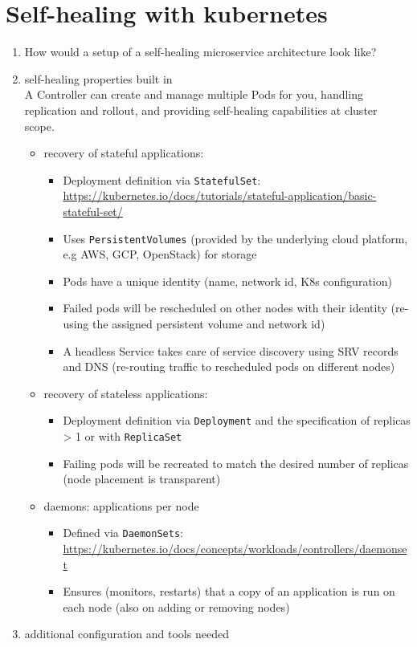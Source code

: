 \section{Self-healing with \gls{kubernetes}}
  \begin{enumerate}
    \item How would a setup of a self-healing microservice architecture look like?
    \item self-healing properties built in\hfill\\
          A Controller can create and manage multiple Pods for you, handling replication and rollout, and providing self-healing capabilities at cluster scope.

          \begin{itemize}
            \item recovery of stateful applications:
              \begin{itemize}
                \item Deployment definition via \texttt{StatefulSet}: \url{https://kubernetes.io/docs/tutorials/stateful-application/basic-stateful-set/}
                \item  Uses \texttt{PersistentVolumes} (provided by the underlying cloud platform, e.g AWS, GCP, OpenStack) for storage
                \item Pods have a unique identity (name, network id, K8s configuration)
                \item Failed pods will be rescheduled on other nodes with their identity (re-using the assigned persistent volume and network id)
                \item A headless Service takes care of service discovery using SRV records and DNS (re-routing traffic to rescheduled pods on different nodes)
              \end{itemize}

            \item recovery of stateless applications:
              \begin{itemize}
                \item Deployment definition via \texttt{Deployment} and the specification of replicas > 1 or with \texttt{ReplicaSet}
                \item Failing pods will be recreated to match the desired number of replicas (node placement is transparent)
              \end{itemize}

            \item daemons: applications per node
              \begin{itemize}
                \item Defined via \texttt{DaemonSets}: \url{https://kubernetes.io/docs/concepts/workloads/controllers/daemonset}
                \item Ensures (monitors, restarts) that a copy of an application is run on each node (also on adding or removing nodes)
              \end{itemize}
          \end{itemize}
    \item additional configuration and tools needed
  \end{enumerate}

